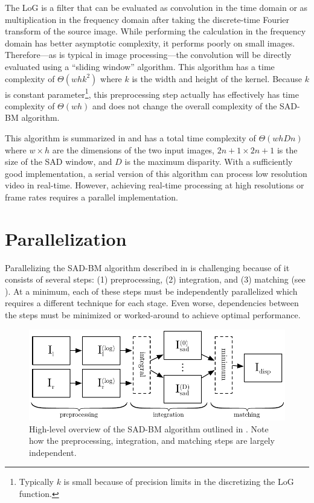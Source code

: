 \documentclass{article}
\begin{document}
The LoG is a filter that can be evaluated as convolution in the time domain or
as multiplication in the frequency domain after taking the discrete-time
Fourier transform of the source image. While performing the calculation in the
frequency domain has better asymptotic complexity, it performs poorly on small
images. Therefore---as is typical in image processing---the convolution will be
directly evaluated using a ``sliding window'' algorithm. This algorithm has a
time complexity of $\Theta(whk^2)$ where $k$ is the width and height of the
kernel. Because $k$ is constant parameter\footnote{Typically $k$ is small
because of precision limits in the discretizing the LoG function.}, this
preprocessing step actually has effectively has time complexity of $\Theta(wh)$
and does not change the overall complexity of the SAD-BM algorithm.

This algorithm is summarized in  and has a total time
complexity of $\Theta(whDn)$ where $w \times h$ are the dimensions of the two
input images, $2n + 1 \times 2n + 1$ is the size of the SAD window, and $D$ is
the maximum disparity. With a sufficiently good implementation, a serial
version of this algorithm can process low resolution video in real-time.
However, achieving real-time processing at high resolutions or frame rates
requires a parallel implementation.

\section{Parallelization}
\label{sec:parallel}
Parallelizing the SAD-BM algorithm described in  is
challenging because of it consists of several steps: (1) preprocessing, (2)
integration, and (3) matching (see ). At a minimum, each
of these steps must be independently parallelized which requires a different
technique for each stage. Even worse, dependencies between the steps must be
minimized or worked-around to achieve optimal performance.

\begin{figure}
    \centering
    \includegraphics[width=\textwidth]{figures/pipeline}
    \caption{
        High-level overview of the SAD-BM algorithm outlined in
        . Note how the preprocessing, integration, and
        matching steps are largely independent.
    }
    \label{fig:pipeline}
\end{figure}
\end{document}
